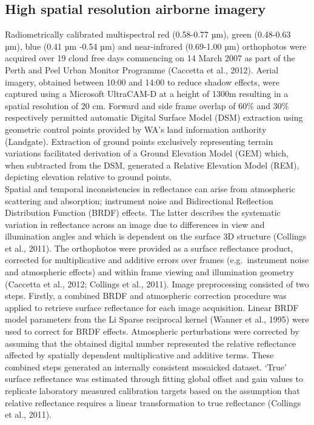 \documentclass[]{book}
\begin{document}
\subsection{High spatial resolution airborne
imagery}\label{high-spatial-resolution-airborne-imagery}

Radiometrically calibrated multispectral red (0.58-0.77 µm), green
(0.48-0.63 µm), blue (0.41 µm -0.54 µm) and near-infrared (0.69-1.00 µm)
orthophotos were acquired over 19 cloud free days commencing on 14 March
2007 as part of the Perth and Peel Urban Monitor Programme (Caccetta et
al., 2012). Aerial imagery, obtained between 10:00 and 14:00 to reduce
shadow effects, were captured using a Microsoft UltraCAM-D at a height
of 1300m resulting in a spatial resolution of 20 cm. Forward and side
frame overlap of 60\% and 30\% respectively permitted automatic Digital
Surface Model (DSM) extraction using geometric control points provided
by WA's land information authority (Landgate). Extraction of ground
points exclusively representing terrain variations facilitated
derivation of a Ground Elevation Model (GEM) which, when subtracted from
the DSM, generated a Relative Elevation Model (REM), depicting elevation
relative to ground points.\\
Spatial and temporal inconsistencies in reflectance can arise from
atmospheric scattering and absorption; instrument noise and
Bidirectional Reflection Distribution Function (BRDF) effects. The
latter describes the systematic variation in reflectance across an image
due to differences in view and illumination angles and which is
dependent on the surface 3D structure (Collings et al., 2011). The
orthophotos were provided as a surface reflectance product, corrected
for multiplicative and additive errors over frames (e.g.~instrument
noise and atmospheric effects) and within frame viewing and illumination
geometry (Caccetta et al., 2012; Collings et al., 2011). Image
preprocessing consisted of two steps. Firstly, a combined BRDF and
atmospheric correction procedure was applied to retrieve surface
reflectance for each image acquisition. Linear BRDF model parameters
from the Li Sparse reciprocal kernel (Wanner et al., 1995) were used to
correct for BRDF effects. Atmospheric perturbations were corrected by
assuming that the obtained digital number represented the relative
reflectance affected by spatially dependent multiplicative and additive
terms. These combined steps generated an internally consistent mosaicked
dataset. `True' surface reflectance was estimated through fitting global
offset and gain values to replicate laboratory measured calibration
targets based on the assumption that relative reflectance requires a
linear transformation to true reflectance (Collings et al., 2011).
\end{document}
